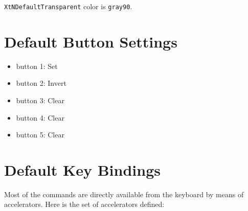 \noindent
{\tt XtNDefaultTransparent} color is {\tt gray90}.

\section{Default Button Settings}

\begin{itemize} 
\item button 1: Set
\item button 2: Invert
\item button 3: Clear
\item button 4: Clear
\item button 5: Clear
\end{itemize} 

\section{Default Key Bindings}
Most of the commands are directly available from the keyboard by means
of accelerators. Here is the set of accelerators defined:\\

